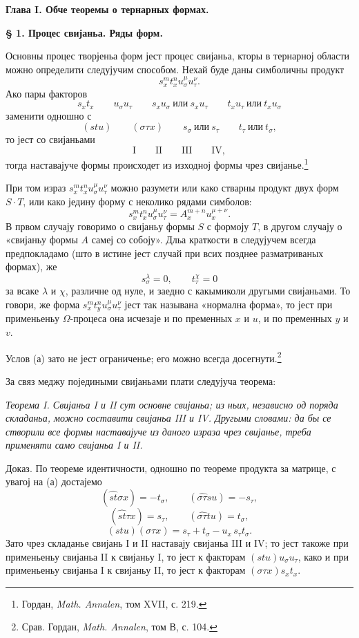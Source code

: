 ﻿\documentclass[11pt]{article}
\begin{document}
\begin{center}
{\Large\bfseries Глава I. \quad Обче теоремы о тернарных формах.}
\end{center}

\begin{center}
\textbf{§ 1. \quad Процес свијаньа. \quad Ряды форм.}
\end{center}

Основны процес творјеньа форм јест процес свијаньа, кторы в тернарној области можно определити следујучим способом. Нехай буде даны симболичны продукт
\[
s_x^m t_x^n u_\sigma^\mu u_\tau^\nu .
\]
Ако пары факторов
\[
s_xt_x\qquad u_\sigma u_\tau\qquad s_xu_\sigma\ \text{или}\ s_xu_\tau
\qquad t_xu_\tau\ \text{или}\ t_xu_\sigma
\]
заменити одношно с
\[
(stu)\qquad (\sigma\tau x)\qquad s_\sigma\ \text{или}\ s_\tau
\qquad t_\tau\ \text{или}\ t_\sigma,
\]
то јест со свијаньами
\[
\text{I}\qquad\text{II}\qquad\text{III}\qquad\text{IV},
\]
тогда наставајуче формы происходет из изходној формы чрез свијанье.\footnote{Гордан, \emph{Math. Annalen}, том XVII, с. 219.}

При том израз $s_x^m t_x^n u_\sigma^\mu u_\tau^\nu$ можно разумети или како стварны продукт двух форм $S\cdot T$, или како једину форму с неколико рядами симболов:
\[
s_x^m t_x^n u_\sigma^\mu u_\tau^\nu=A_x^{m+n}u_x^{\mu+\nu}.
\]
В првом случају говоримо о свијаньу формы $S$ с формоју $T$, в другом случају о «свијаньу формы $A$ самеј со собоју». Дльа краткости в следујучем всегда предпокладамо (што в истине јест случай при всих позднее разматриваных формах), же
\[
\tag{a}
s_\sigma^\lambda=0,\qquad t_\tau^\chi=0
\]
за всаке $\lambda$ и $\chi$, различне од нуле, и заедно с какымиколи другыми свијаньами. То говори, же форма $s_x^m t_y^n u_\sigma^\mu u_\tau^\nu$ јест так называна «нормална форма», то јест при применьеньу $\Omega$-процеса она исчезаје и по пременных $x$ и $u$, и по пременных $y$ и $v$.

Услов (а) зато не јест ограниченье; его можно всегда досегнути.\footnote{Срав. Гордан, \emph{Math. Annalen}, том В, с. 104.}

За связ меджу поједиными свијаньами плати следујуча теорема:

{\itshape Теорема I. Свијаньа I и II сут основне свијаньа; из ньих, независно од поряда складаньа, можно составити свијаньа III и IV. Другыми словами: да бы се створили все формы наставајуче из даного израза чрез свијанье, треба применяти само свијаньа I и II.}

Доказ. По теореме идентичности, одношно по теореме продукта за матрице, с увагој на (а) достајемо
\[
(\widehat{st}\sigma x)=-t_\sigma,\qquad
(\widehat{\sigma\tau}su)=-s_\tau,
\]
\[
(\widehat{st}\tau x)=s_\tau,\qquad
(\widehat{\sigma\tau}tu)=t_\sigma,
\]
\[
(stu)(\sigma\tau x)=s_\tau+t_\sigma-u_x\,s_\tau t_\sigma .
\]
Зато чрез складанье свијань I и II наставају свијаньа III и IV; то јест такоже при применьеньу свијаньа II к свијаньу I, то јест к факторам $(stu)u_\sigma u_\tau$, како и при применьеньу свијаньа I к свијаньу II, то јест к факторам $(\sigma\tau x)s_xt_x$.
\end{document}
